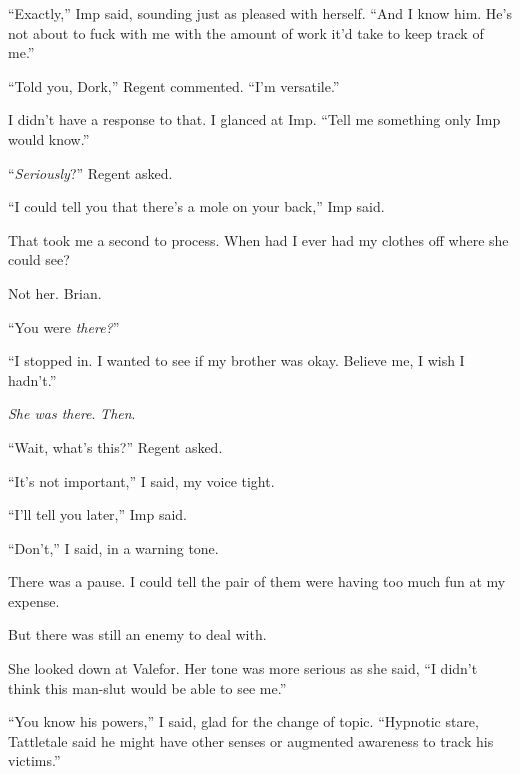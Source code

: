 ``Exactly,'' Imp said, sounding just as pleased with herself.  ``And I know him.  He's not about to fuck with me with the amount of work it'd take to keep track of me.''



``Told you, Dork,'' Regent commented.  ``I'm versatile.''



I didn't have a response to that.  I glanced at Imp.  ``Tell me something only Imp would know.''



``\emph{Seriously}?'' Regent asked.



``I could tell you that there's a mole on your back,'' Imp said.



That took me a second to process.  When had I ever had my clothes off where she could see?



Not her.  Brian.



``You were \emph{there?}''



``I stopped in.  I wanted to see if my brother was okay.  Believe me, I wish I hadn't.''



\emph{She was there}.  \emph{Then}.



``Wait, what's this?'' Regent asked.



``It's not important,'' I said, my voice tight.



``I'll tell you later,'' Imp said.



``Don't,'' I said, in a warning tone.



There was a pause.  I could tell the pair of them were having too much fun at my expense.



But there was still an enemy to deal with.



She looked down at Valefor.  Her tone was more serious as she said, ``I didn't think this man-slut would be able to see me.''



``You know his powers,'' I said, glad for the change of topic.  ``Hypnotic stare, Tattletale said he might have other senses or augmented awareness to track his victims.''



